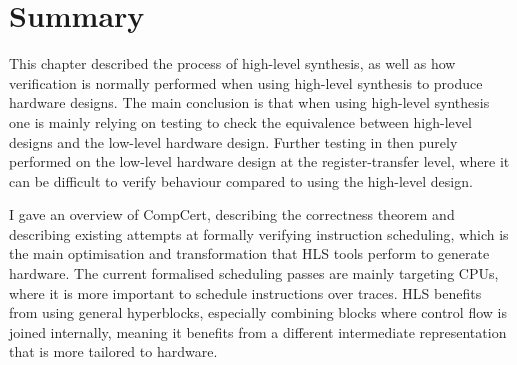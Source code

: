 \section{Summary}%
\label{sec:bg:summary}

This chapter described the process of high-level synthesis, as well as how
verification is normally performed when using high-level synthesis to produce
hardware designs.  The main conclusion is that when using high-level synthesis
one is mainly relying on testing to check the equivalence between high-level
designs and the low-level hardware design.  Further testing in then purely
performed on the low-level hardware design at the register-transfer level, where
it can be difficult to verify behaviour compared to using the high-level design.

I gave an overview of CompCert, describing the correctness theorem and
describing existing attempts at formally verifying instruction scheduling, which
is the main optimisation and transformation that \gls{HLS} tools perform to
generate hardware.  The current formalised scheduling passes are mainly
targeting \glspl{CPU}, where it is more important to schedule instructions over
traces.  \gls{HLS} benefits from using general hyperblocks, especially combining
blocks where control flow is joined internally, meaning it benefits from a
different intermediate representation that is more tailored to hardware.

